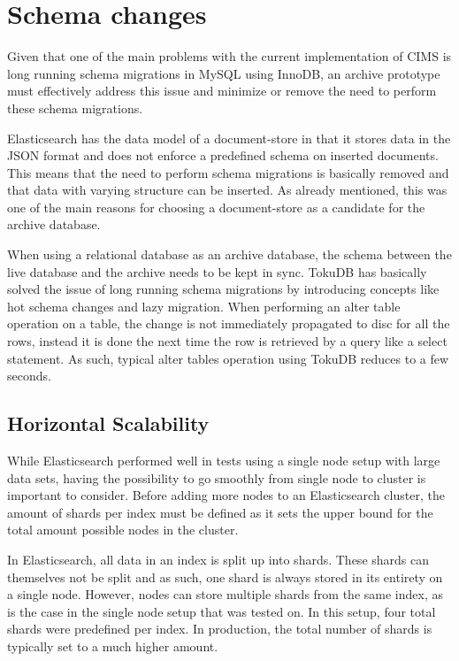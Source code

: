 \section{Schema changes}
Given that one of the main problems with the current implementation of CIMS is long running schema migrations in MySQL using InnoDB, an archive prototype must effectively address this issue and minimize or remove the need to perform these schema migrations.

Elasticsearch has the data model of a document-store in that it stores data in the JSON format and does not enforce a predefined schema on inserted documents. This means that the need to perform schema migrations is basically removed and that data with varying structure can be inserted. As already mentioned, this was one of the main reasons for choosing a document-store as a candidate for the archive database.

When using a relational database as an archive database, the schema between the live database and the archive needs to be kept in sync. TokuDB has basically solved the issue of long running schema migrations by introducing concepts like hot schema changes and lazy migration. When performing an alter table operation on a table, the change is not immediately propagated to disc for all the rows, instead it is done the next time the row is retrieved by a query like a select statement. As such, typical alter tables operation using TokuDB reduces to a few seconds.


\subsection{Horizontal Scalability}
While Elasticsearch performed well in tests using a single node setup with large data sets, having the possibility to go smoothly from single node to cluster is important to consider. Before adding more nodes to an Elasticsearch cluster, the amount of shards per index must be defined as it sets the upper bound for the total amount possible nodes in the cluster.

In Elasticsearch, all data in an index is split up into shards. These shards can themselves not be split and as such, one shard is always stored in its entirety on a single node. However, nodes can store multiple shards from the same index, as is the case in the single node setup that was tested on. In this setup, four total shards were predefined per index. In production, the total number of shards is typically set to a much higher amount. 

